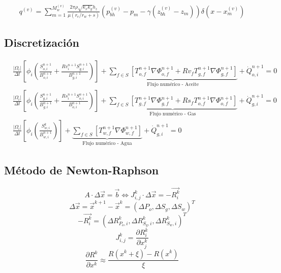 \begin{align}
	q^{(v)} = \sum_{m=1}^{M^{(v)}_{w}}\frac{2\pi\rho\sqrt{k_{x}k_{y}}h_{z}}{\mu\left(r_{e}/r_{w} +s\right)}\left(p_{bh}^{(v)}-p_{m}-\gamma\left(z_{bh}^{(v)}-z_{m}\right)\right)\delta\left(x-x_{m}^{(v)}\right)
\end{align}
%
\subsection{Discretización}
\begin{align}
&\frac{|\Omega_{i}|}{\Delta t}\left[ \phi_{i} \left( \frac{S_{o,i}^{n+1}}{B_{o,i}^{n+1}} + \frac{Rv_{i}^{n+1}S_{g,i}^{n+1}}{B_{g,i}^{n+1}}\right)\right] + 
\underbrace{\sum_{f \in S}\left[ T^{n+1}_{o,f} \nabla{\Phi_{o,f}^{n+1}} + Rv_{f}T^{n+1}_{g,f} \nabla{\Phi_{g,f}^{n+1}} \right] }_{\text{Flujo numérico - Aceite}}+ \dot{Q}_{o,i}^{n+1} = 0 \\
&\frac{|\Omega_{i}|}{\Delta t}\left[ \phi_{i} \left( \frac{S_{g,i}^{n+1}}{B_{g,i}^{n+1}} + \frac{Rs_{i}^{n+1}S_{o,i}^{n+1}}{B_{o,i}^{n+1}}\right)\right] + 
\underbrace{\sum_{f \in S}\left[ T^{n+1}_{g,f}\nabla{\Phi_{g,f}^{n+1} + Rs_{f}T^{n+1}_{o,f} \nabla{\Phi_{o,f}^{n+1}}} \right] }_{\text{Flujo numérico - Gas}}+ \dot{Q}_{g,i}^{n+1} = 0 \\
&\frac{|\Omega_{i}|}{\Delta t}\left[ \phi_{i} \left( \frac{S_{w,i}^{k}}{B_{w,i}^{n+1}}\right)\right]
+ 
\underbrace{\sum_{f \in S}\left[ T^{n+1}_{w,f}\nabla{\Phi_{w,f}^{n+1}} \right]}_{\text{Flujo numérico - Agua}} + \dot{Q}_{g,i}^{n+1} = 0 
\end{align}
\subsection{Método de Newton-Raphson}
%

\begin{equation}
A \cdot {\Delta \vec{x}} = \vec{b} \Leftrightarrow J^{k}_{i,j} \cdot {\Delta \vec{x}} = -\vec{R^{k}_{i}}
\end{equation}
\begin{equation}
\Delta \vec{x} = \vec{x}^{k+1} - \vec{x}^{k} = \left(\Delta P_o, \Delta S_g, \Delta S_w \right)^T
\end{equation}
\begin{equation}
-\vec{R^k_i} = \left(\Delta R^k_{P_o,i}, \Delta R^k_{S_g,i}, \Delta R^k_{S_w,i} \right)^T
\end{equation}
\begin{equation}
J^k_{i,j}=\frac{\partial R^k_i}{\partial x^k_j}	
\end{equation}
\begin{equation}
\frac{\partial R^k}{\partial x^k} \approx \frac{R\left(x^k + \xi \right) - R\left(x^k \right)}{\xi}
\end{equation}

